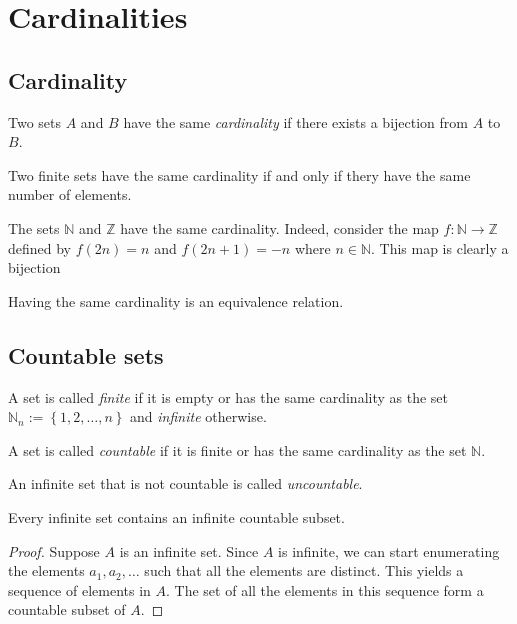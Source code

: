 \section{Cardinalities}

\subsection{Cardinality}
\begin{definition}[Cardinality]
    Two sets $A$ and $B$ have the same \emph{cardinality} if there exists a
    bijection from $A$ to $B$.
\end{definition}

\begin{example}
    Two finite sets have the same cardinality if and only if thery have the same
    number of elements.
\end{example}

\begin{example}
    The sets $\mathbb{N}$ and $ \mathbb{Z} $ have the same cardinality. Indeed,
    consider the map $ f:\mathbb{N} \rightarrow \mathbb{Z} $ defined by
    $ f(2n) = n $ and $ f(2n+1) = -n $ where $ n \in \mathbb{N} $.
    This map is clearly a bijection
\end{example}

\begin{theorem}
    Having the same cardinality is an equivalence relation.
\end{theorem}

\subsection{Countable sets}
\begin{definition}
    A set is called \emph{finite} if it is empty or has the same cardinality as the set $ \mathbb{N}_n := \left\{1,2,\dots,n\right\} $ and \emph{infinite} otherwise.
\end{definition}

\begin{definition}
    A set is called \emph{countable} if it is finite or has the same cardinality as the set $ \mathbb{N} $.

    An infinite set that is not countable is called \emph{uncountable}.
\end{definition}

\begin{theorem}
    Every infinite set contains an infinite countable subset.
\end{theorem}
\begin{proof}[Proof]
    Suppose $A$ is an infinite set. Since $A$ is infinite, we can start enumerating the elements $ a_1,a_2,\dots $ such that all the elements are distinct. This yields a sequence of elements in $A$.
    The set of all the elements in this sequence form a countable subset of $A$.
\end{proof}

